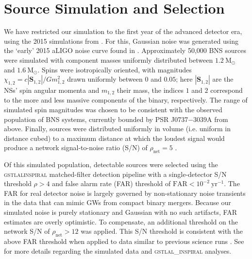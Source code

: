\section{Source Simulation and Selection}\label{sec:sources}

We have restricted our simulation to the first year of the advanced detector era, using the 2015 simulations from \citet{Singer_2014}. For this, Gaussian noise was generated using the `early' 2015 aLIGO noise curve found in \citet{Barsotti:2012}. Approximately 50,000 BNS sources were simulated with component masses uniformly distributed between $1.2~\mathrm{M}_\odot$ and $1.6~\mathrm{M}_\odot$. Spins were isotropically oriented, with magnitudes $\chi_{1,2} = c |\mathbf{S}_{1,2}|/G m_{1,2}^2$ drawn uniformly between $0$ and $0.05$; here $|\mathbf{S}_{1,2}|$ are the NSs' spin angular momenta and $m_{1,2}$ their mass, the indices $1$ and $2$ correspond to the more and less massive components of the binary, respectively.  The range of simulated spin magnitudes was chosen to be consistent with the observed population of BNS systems, currently bounded by PSR J0737$-$3039A \citep{Burgay_2003,Brown_2012} from above.  Finally, sources were distributed uniformly in volume (i.e. uniform in distance cubed) to a maximum distance at which the loudest signal would produce a network signal-to-noise ratio (S/N) of $\rho_\mathrm{net} = 5$ \citep{Singer_2014}.

Of this simulated population, detectable sources were selected using the \textsc{gstlal{\textunderscore}inspiral} matched-filter detection pipeline \citep{Cannon_2012} with a single-detector S/N threshold $\rho>4$ and false alarm rate (FAR) threshold of $\mathrm{FAR}<10^{-2}~\mathrm{yr}^{-1}$.  The FAR for real detector noise is largely governed by non-stationary noise transients in the data that can mimic GWs from compact binary mergers.  Because our simulated noise is purely stationary and Gaussian with no such artifacts, FAR estimates are overly optimistic. To compensate, an additional threshold on the network S/N of $\rho_\mathrm{net} > 12$ was applied. This S/N threshold is consistent with the above FAR threshold when applied to data similar to previous science runs \cite{2013arXiv1304.0670L,Berry_2014}. See \citet{Singer_2014} for more details regarding the simulated data and \textsc{gstlal\_inspiral} analyses.
  